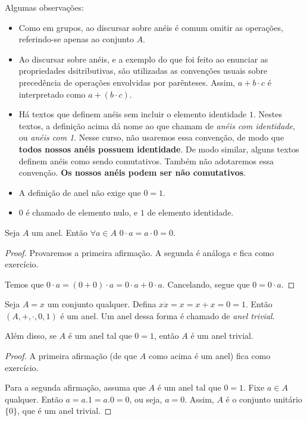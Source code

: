 Algumas observações:
\begin{itemize}
    \item Como em grupos, ao discursar sobre anéis é comum omitir as operações, referindo-se apenas ao conjunto $A$.
    \item Ao discursar sobre anéis, e a exemplo do que foi feito ao enunciar as propriedades dsitributivas, são utilizadas as convenções usuais sobre precedência de operações envolvidas por parênteses. Assim, $a + b \cdot c$ é interpretado como $a + (b \cdot c)$.
    \item Há textos que definem anéis sem incluir o elemento identidade $1$. Nestes textos, a definição acima dá nome ao que chamam de \emph{anéis com identidade}, ou \emph{anéis com 1}. Nesse curso, não usaremos essa convenção, de modo que \textbf{todos nossos anéis possuem identidade}. De modo similar, alguns textos definem anéis como sendo comutativos. Também não adotaremos essa convenção. \textbf{Os nossos anéis podem ser não comutativos}.
    \item A definição de anel não exige que $0=1$.
    \item $0$ é chamado de elemento nulo, e $1$ de elemento identidade.
\end{itemize}

\begin{prop}
    Seja $A$ um anel. Então $\forall a \in A$ $0 \cdot a = a \cdot 0 = 0$.
\end{prop}
\begin{proof}
Provaremos a primeira afirmação. A segunda é análoga e fica como exercício.

Temos que $0\cdot a=(0+0)\cdot a=0\cdot a +0\cdot a$. Cancelando, segue que $0=0\cdot a$.
\end{proof}

\begin{prop}
    Seja $A={x}$ um conjunto qualquer. Defina $x\dot x=x=x+x=0=1$. Então $(A, +, \cdot, 0, 1)$ é um anel. Um anel dessa forma é chamado de \emph{anel trivial}.
    
    Além disso, se $A$ é um anel tal que $0=1$, então $A$ é um anel trivial.
\end{prop}
\begin{proof}
    A primeira afirmação (de que $A$ como acima é um anel) fica como exercício.

    Para a segunda afirmação, assuma que $A$ é um anel tal que $0=1$. Fixe $a \in A$ qualquer. Então $a=a.1=a.0=0$, ou seja, $a=0$. Assim, $A$ é o conjunto unitário $\{0\}$, que é um anel trivial.
\end{proof}

